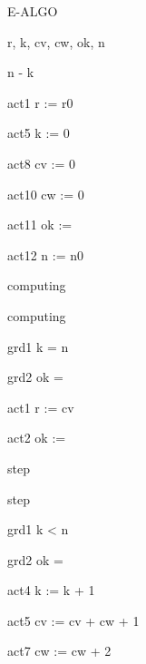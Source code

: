 \documentclass[11pt,a4paper]{article}
\begin{document}
\begin{machine}{E-ALGO}
  \begin{variables}{r, k, cv, cw, ok, n}
  \end{variables}
  \begin{variant} n - k \end{variant}
  \begin{initialisation}
    \begin{action}{act1} r := r0 \end{action}
    \begin{action}{act5} k := 0 \end{action}
    \begin{action}{act8} cv := 0 \end{action}
    \begin{action}{act10} cw := 0 \end{action}
    \begin{action}{act11} ok := \False \end{action}
    \begin{action}{act12} n := n0 \end{action}
  \end{initialisation}
  \begin{event}{computing}
    \begin{refines} computing \end{refines}
    \begin{guard}{grd1} k = n \end{guard}
    \begin{guard}{grd2} ok = \False \end{guard}
    \begin{action}{act1} r := cv \end{action}
    \begin{action}{act2} ok := \True \end{action}
  \end{event}
  \begin{event}[convergent]{step}
    \begin{refines} step \end{refines}
    \begin{guard}{grd1} k < n \end{guard}
    \begin{guardth}{grd2} ok = \False \end{guardth}
    \begin{action}{act4} k := k + 1 \end{action}
    \begin{action}{act5} cv := cv + cw + 1 \end{action}
    \begin{action}{act7} cw := cw + 2 \end{action}
  \end{event}
\end{machine}
\end{document}
